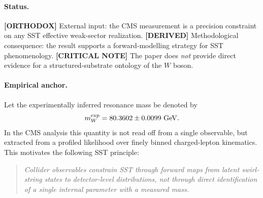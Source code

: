 \documentclass[11pt]{article}
\theoremstyle{definition}
\theoremstyle{plain}
\theoremstyle{remark}
\begin{document}
        \paragraph{Status.}
            \textbf{[ORTHODOX]} External input: the CMS measurement is a precision constraint on any SST effective weak-sector realization.
            \textbf{[DERIVED]} Methodological consequence: the result supports a forward-modelling strategy for SST phenomenology.
            \textbf{[CRITICAL NOTE]} The paper does \emph{not} provide direct evidence for a structured-substrate ontology of the $W$ boson.
    
        \paragraph{Empirical anchor.}
            Let the experimentally inferred resonance mass be denoted by
            \begin{equation}
                m_W^{\rm exp} = 80.3602 \pm 0.0099~{\rm GeV}.
            \end{equation}
            In the CMS analysis this quantity is not read off from a single observable, but extracted from a profiled likelihood over finely binned charged-lepton kinematics. This motivates the following SST principle:
            
            \begin{quote}
                \emph{Collider observables constrain SST through forward maps from latent swirl-string states to detector-level distributions, not through direct identification of a single internal parameter with a measured mass.}
            \end{quote}
    
\end{document}

